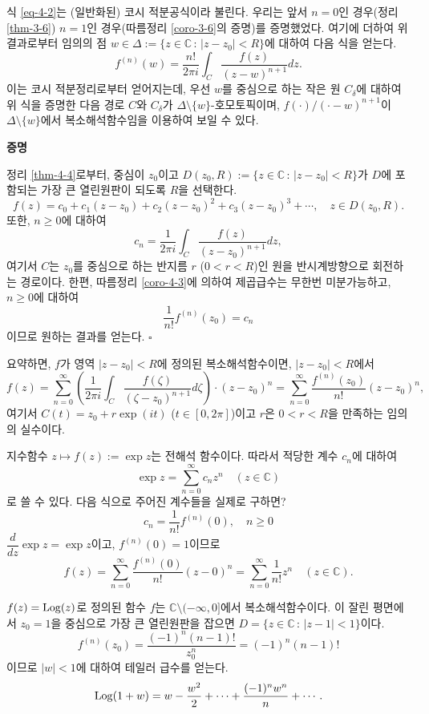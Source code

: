 식 \eqref{eq-4-2}는 (일반화된) 코시 적분공식이라 불린다. 우리는 앞서 $n=0$인 경우(정리 \ref{thm-3-6})\와
$n=1$인 경우(따름정리 \ref{coro-3-6}의 증명)를 증명했었다.
여기에 더하여 위 결과로부터 임의의 점 $w\in \Delta:=\{z\in\mathbb C\,:\, |z-z_0| <R \}$에 
대하여 다음 식을 얻는다.
\[
f^{(n)}(w) = \dfrac{n!}{2\pi i}\int_C \dfrac{f(z)}{(z-w)^{n+1}}dz.
\]
이는 코시 적분정리로부터 얻어지는데,
우선 $w$를 중심으로 하는 작은 원 $C_\delta$에 대하여 위 식을 증명한 다음
경로 $C$와 $C_\delta$가 $\Delta\setminus \{w\}$-호모토픽이며,
$f(\cdot)/(\cdot-w)^{n+1}$이 $\Delta\setminus \{w\}$에서 복소해석함수임을 이용하여 보일 수 있다.

{\bf 증명}

정리 \ref{thm-4-4}로부터,
중심이 $z_0$이고 $D(z_0,R):= \{ z\in \mathbb C \,:\, |z-z_0|<R\}$가
$D$에 포함되는 가장 큰 열린원판이 되도록 $R$을 선택한다.
\begin{equation}\label{eq-4-3}
f(z) = c_0 + c_1(z-z_0) + c_2(z-z_0)^2 + c_3(z-z_0)^3 + \cdots, \quad
z\in D(z_0,R).
\end{equation}
또한, $n\ge0$에 대하여
\[
c_n = \dfrac1{2\pi i} \int_C \dfrac{f(z)}{(z-z_0)^{n+1}} dz,
\]
여기서 $C$는 $z_0$를 중심으로 하는 반지름 $r$ ($0<r<R$)인 원을 반시계방향으로 회전하는 경로이다.
한편, 따름정리 \ref{coro-4-3}에 의하여
제곱급수는 무한번 미분가능하고, $n\ge0$에 대하여
\[
\dfrac1{n!}f^{(n)}(z_0) = c_n
\]
이므로 원하는 결과를 얻는다. \hfill $\square$

요약하면, 
$f$가 영역 $|z-z_0|<R$에 정의된 복소해석함수이면, $|z-z_0|<R$에서
\[
f(z) = \sum_{n=0}^\infty \left( \dfrac 1{2\pi i}
\int_C \dfrac{f(\zeta)}{(\zeta - z_0)^{n+1}}d\zeta \right)\cdot
(z-z_0)^n
=  \sum_{n=0}^\infty \dfrac{f^{(n)}(z_0)}{n!} (z-z_0)^n,
\]
여기서 $C(t) = z_0 + r\exp (it)$ ($t\in[0,2\pi]$)이고 $r$은
$0<r<R$을 만족하는 임의의 실수이다.

\begin{saltexample}[label=exxample-4-3]{}{}
지수함수  $z\mapsto f(z):=\exp z$는 전해석 함수이다.
따라서 적당한 계수 $c_n$에 대하여
\[
\exp z = \sum_{n=0}^\infty c_nz^n \quad (z\in \mathbb C)
\]
로 쓸 수 있다. 
다음 식으로 주어진 계수들을 실제로 구하면?
\[
c_n = \dfrac1{n!}f^{(n)}(0), \quad n\ge 0
\]
$\dfrac d{dz}\exp z = \exp z$이고, $f^{(n)}(0)=1$이므로
\[
f(z) = \sum_{n=0}^\infty \dfrac{f^{(n)}(0)}{n!} (z-0)^n 
=\sum_{n=0}^\infty \dfrac{1}{n!} z^n\quad (z\in\mathbb C).
\]
\end{saltexample}

\begin{saltexample}[label=exxample-4-4]{}{}
$f(z) = \mathop{\mathrm{Log}}(z)$로 정의된 함수 $f$는 $\mathbb C\setminus (-\infty,0]$에서 
복소해석함수이다. 이 잘린 평면에서 $z_0=1$을 중심으로 가장 큰 열린원판을 잡으면
$D = \{z\in\mathbb C\,:\, |z-1|<1\}$이다.
\[
f^{(n)}(z_0) = \dfrac{(-1)^n(n-1)!}{z_0^n} = (-1)^n (n-1)!
\]
이므로 $|w|<1$에 대하여 테일러 급수를 얻는다.
\[
\mathop{\mathrm{Log}} (1+w) = w - \displaystyle\frac {w^2}{2} + \cdots + \displaystyle\frac{(-1)^nw^n}n + \cdots.
\]
\end{saltexample}

